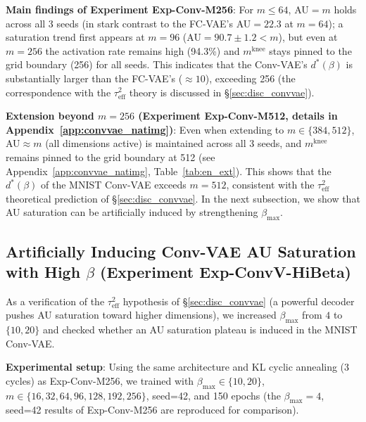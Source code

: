 \documentclass[make,article,submit,pdftex,moreauthors]{Definitions/mdpi}
\newcommand{\mknee}{m^{\mathrm{knee}}}
\begin{document}
\textbf{Main findings of Experiment Exp-Conv-M256}:
For $m \leq 64$, AU$=m$ holds across all 3 seeds (in stark contrast to the FC-VAE's
AU$=22.3$ at $m=64$); a saturation trend first appears at $m = 96$
(AU$=90.7\pm1.2 < m$), but even at $m=256$ the activation rate remains high (94.3\%) and
$\mknee$ stays pinned to the grid boundary (256) for all seeds.
This indicates that the Conv-VAE's $d^*(\beta)$ is substantially larger than the FC-VAE's
($\approx 10$), exceeding 256
(the correspondence with the $\tau^2_\mathrm{eff}$ theory is discussed in
\S\ref{sec:disc_convvae}).

\textbf{Extension beyond $m=256$ (Experiment Exp-Conv-M512, details in Appendix~\ref{app:convvae_natimg})}:
Even when extending to $m \in \{384, 512\}$, AU$\approx m$ (all dimensions active) is maintained across
all 3 seeds, and $\mknee$ remains pinned to the grid boundary at 512
(see Appendix~\ref{app:convvae_natimg}, Table~\ref{tab:en_ext}).
This shows that the $d^*(\beta)$ of the MNIST Conv-VAE exceeds $m=512$,
consistent with the $\tau^2_\mathrm{eff}$ theoretical prediction of \S\ref{sec:disc_convvae}.
In the next subsection, we show that AU saturation can be artificially induced by strengthening $\beta_{\max}$.

\subsection{Artificially Inducing Conv-VAE AU Saturation with High $\beta$ (Experiment Exp-ConvV-HiBeta)}\label{sec:exp_hibeta}

As a verification of the $\tau^2_\mathrm{eff}$ hypothesis of \S\ref{sec:disc_convvae}
(a powerful decoder pushes AU saturation toward higher dimensions),
we increased $\beta_{\max}$ from $4$ to $\{10, 20\}$ and checked whether an AU saturation plateau
is induced in the MNIST Conv-VAE.

\textbf{Experimental setup}: Using the same architecture and KL cyclic annealing (3 cycles) as Exp-Conv-M256,
we trained with $\beta_{\max} \in \{10, 20\}$, $m \in \{16, 32, 64, 96, 128, 192, 256\}$,
seed=42, and 150 epochs (the $\beta_{\max}=4$, seed=42 results of Exp-Conv-M256 are reproduced for comparison).
\end{document}
